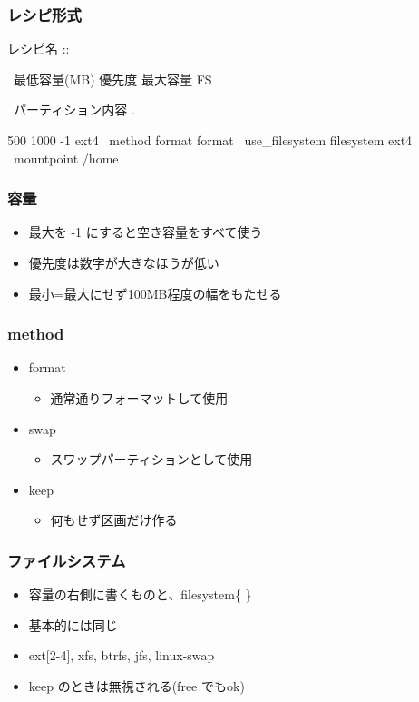 \documentclass[mingoth,a4paper]{jsarticle}
\begin{document}
\clearpage

\subsubsection{レシピ形式}

レシピ名 ::

\ 最低容量(MB) 優先度 最大容量 FS

\ パーティション内容 .

\begin{commandline}
 500 1000 -1 ext4 \
 method{ format } format{ } \
 use_filesystem{ } filesystem{ ext4 } \
 mountpoint{ /home }
\end{commandline}

\subsubsection{容量}
\begin{itemize}
\item 最大を -1 にすると空き容量をすべて使う
\item 優先度は数字が大きなほうが低い
\item 最小=最大にせず100MB程度の幅をもたせる
\end{itemize}

\subsubsection{method}
\begin{itemize}
\item format
  \begin{itemize}
  \item 通常通りフォーマットして使用
  \end{itemize}
\item swap
  \begin{itemize}
  \item スワップパーティションとして使用
  \end{itemize}
\item keep
  \begin{itemize}
  \item 何もせず区画だけ作る
  \end{itemize}
\end{itemize}

\subsubsection{ファイルシステム}
\begin{itemize}
\item 容量の右側に書くものと、filesystem\{ \}
\item 基本的には同じ
\item ext[2-4], xfs, btrfs, jfs, linux-swap
\item keep のときは無視される(free でもok)
\end{itemize}
\end{document}
